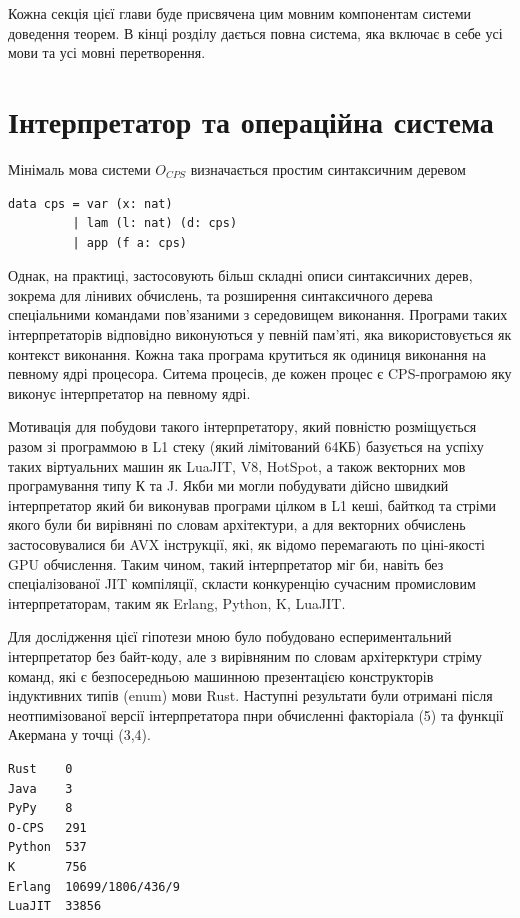 \begin{definition}
\begin{definition}
\begin{definition}
\begin{definition}
Кожна секція цієї глави буде присвячена цим мовним компонентам
системи доведення теорем. В кінці розділу дається повна система, яка включає в себе усі
мови та усі мовні перетворення.

\newpage
\section{Інтерпретатор та операційна система}

Мінімаль мова системи $O_{CPS}$ визначається простим
синтаксичним деревом

\begin{lstlisting}
data cps = var (x: nat)
         | lam (l: nat) (d: cps)
         | app (f a: cps)
\end{lstlisting}

Однак, на практиці, застосовують більш складні описи синтаксичних дерев,
зокрема для лінивих обчислень, та розширення синтаксичного дерева спеціальними
командами пов'язаними з середовищем виконання. Програми таких
інтерпретаторів відповідно виконуються у певній пам'яті, яка
використовується як контекст виконання. Кожна така програма крутиться
як одиниця виконання на певному ядрі процесора. Ситема процесів, де
кожен процес є CPS-програмою яку виконує інтерпретатор на певному ядрі.

Мотивація для побудови такого інтерпретатору, який повністю розміщується
разом зі программою в L1 стеку (який лімітований 64КБ) базується на успіху
таких віртуальних машин як LuaJIT, V8, HotSpot, а також векторних мов
програмування типу К та J. Якби ми могли побудувати дійсно швидкий інтерпретатор
який би виконував програми цілком в L1 кеші, байткод та стріми якого були би
вирівняні по словам архітектури, а для векторних обчислень застосовувалися би AVX інструкції,
які, як відомо перемагають по ціні-якості GPU обчислення. Таким чином, такий
інтерпретатор міг би, навіть без спеціалізованої JIT компіляції, скласти
конкуренцію сучасним промисловим інтерпретаторам, таким як Erlang, Python, K, LuaJIT.

Для дослідження цієї гіпотези мною було побудовано еспериментальний інтерпретатор
без байт-коду, але з вирівняним по словам архітерктури стріму команд, які є
безпосередньою машинною презентацією конструкторів індуктивних типів (enum) мови Rust.
Наступні результати були отримані після неотпимізованої версії інтерпретатора
пнри обчисленні факторіала (5) та функції Акермана у точці (3,4).

\begin{lstlisting}
Rust    0
Java    3
PyPy    8
O-CPS   291
Python  537
K       756
Erlang  10699/1806/436/9
LuaJIT  33856
\end{lstlisting}


\end{definition}
\end{definition}
\end{definition}
\end{definition}
